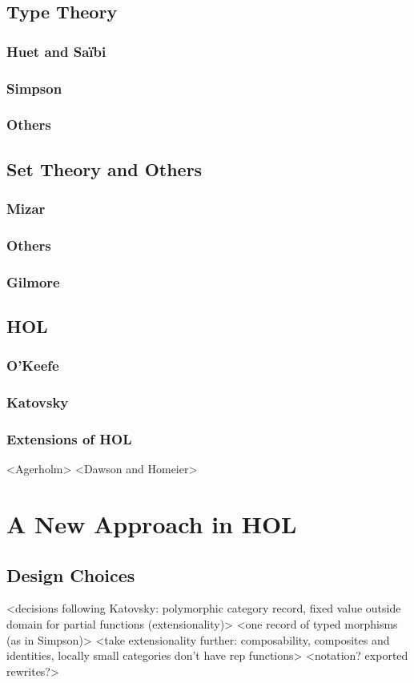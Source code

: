 \documentclass{article}
\begin{document}
\subsection{Type Theory}
\subsubsection{Huet and Sa{\"i}bi}
\subsubsection{Simpson}
\subsubsection{Others}
\subsection{Set Theory and Others}
\subsubsection{Mizar}
\subsubsection{Others}
\subsubsection{Gilmore}
\subsection{HOL}
\subsubsection{O'Keefe}
\subsubsection{Katovsky}
\subsubsection{Extensions of HOL}
<Agerholm>
<Dawson and Homeier>
\section{A New Approach in HOL}
\subsection{Design Choices}
<decisions following Katovsky: polymorphic category record, fixed value outside domain for partial functions (extensionality)>
<one record of typed morphisms (as in Simpson)>
<take extensionality further: composability, composites and identities, locally small categories don't have rep functions>
<notation? exported rewrites?>
\end{document}
